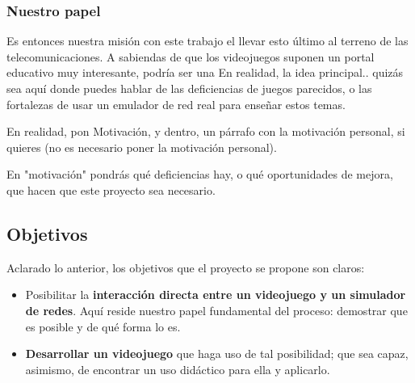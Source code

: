 \subsubsection{Nuestro papel}
Es entonces nuestra misión con este trabajo el llevar esto último al terreno de las telecomunicaciones. A sabiendas de que los videojuegos suponen un portal educativo muy interesante, podría ser una 
En realidad, la idea principal.. quizás sea aquí donde puedes hablar de las deficiencias de juegos parecidos, o las fortalezas de usar un emulador de red real para enseñar estos temas.

En realidad, pon Motivación, y dentro, un párrafo con la motivación personal, si quieres (no es necesario poner la motivación personal).

En "motivación" pondrás qué deficiencias hay, o qué oportunidades de mejora, que hacen que este proyecto sea necesario.
 
\subsection{Objetivos}
Aclarado lo anterior, los objetivos que el proyecto se propone son claros:
\begin{itemize}
\item Posibilitar la \textbf{interacción directa entre un videojuego y un simulador de redes}. Aquí reside nuestro papel fundamental del proceso: demostrar que es posible y de qué forma lo es.
\item \textbf{Desarrollar un videojuego} que haga uso de tal posibilidad; que sea capaz, asimismo, de encontrar un uso didáctico para ella y aplicarlo.
\end{itemize}

